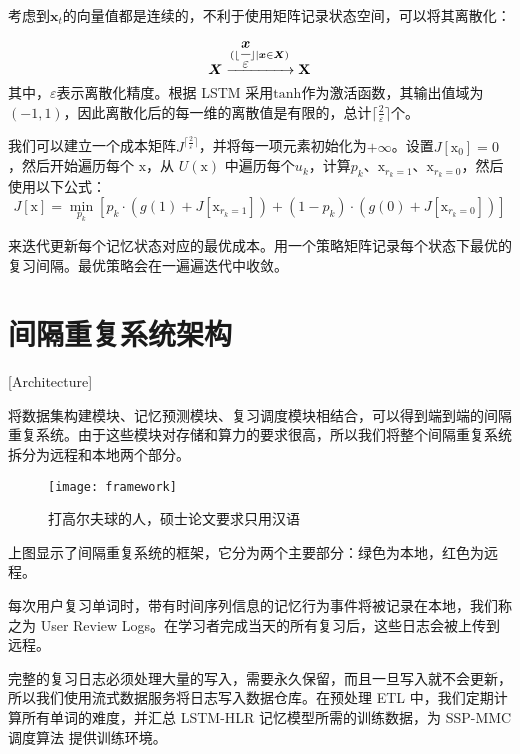考虑到$\boldsymbol x_t$的向量值都是连续的，不利于使用矩阵记录状态空间，可以将其离散化：
\begin{equation}
\boldsymbol X \xrightarrow[]{(\lfloor \cfrac{\boldsymbol x}{\varepsilon} \rfloor|\boldsymbol x \in \boldsymbol X)} \boldsymbol{\mathrm{X}}
\end{equation}
其中，$\varepsilon$表示离散化精度。根据 LSTM 采用$\mathrm{tanh}$作为激活函数，其输出值域为$(-1,1)$，因此离散化后的每一维的离散值是有限的，总计$\lceil\frac{2}{\varepsilon}\rceil$个。

我们可以建立一个成本矩阵$J^{\lceil\frac{2}{\varepsilon}\rceil}$，并将每一项元素初始化为$+\infty$。设置$J[\boldsymbol{\mathrm{x_0}}] = 0$，然后开始遍历每个 $\boldsymbol{\mathrm{x}}$，从 $U(\boldsymbol{\mathrm{x}})$ 中遍历每个$u_k$，计算$p_k$、$\boldsymbol{\mathrm{x}}_{r_k=1}$、$\boldsymbol{\mathrm{x}}_{r_k=0}$，然后使用以下公式：
\begin{equation}
J[\boldsymbol{\mathrm{x}}] = \min\limits_{p_k} [p_k \cdot (g(1) + J[\boldsymbol{\mathrm{x}}_{r_k=1}]) + (1-p_k) \cdot (g(0) + J[\boldsymbol{\mathrm{x}}_{r_k=0}])]
\end{equation}

来迭代更新每个记忆状态对应的最优成本。用一个策略矩阵记录每个状态下最优的复习间隔。最优策略会在一遍遍迭代中收敛。

\section{间隔重复系统架构}[Architecture]

将数据集构建模块、记忆预测模块、复习调度模块相结合，可以得到端到端的间隔重复系统。由于这些模块对存储和算力的要求很高，所以我们将整个间隔重复系统拆分为远程和本地两个部分。

\begin{figure}[htpb]
\centering
\texttt{[image: framework]}
\caption{打高尔夫球的人，硕士论文要求只用汉语}
\end{figure}

上图显示了间隔重复系统的框架，它分为两个主要部分：绿色为本地，红色为远程。

每次用户复习单词时，带有时间序列信息的记忆行为事件将被记录在本地，我们称之为 User Review Logs。在学习者完成当天的所有复习后，这些日志会被上传到远程。

完整的复习日志必须处理大量的写入，需要永久保留，而且一旦写入就不会更新，所以我们使用流式数据服务将日志写入数据仓库。在预处理 ETL 中，我们定期计算所有单词的难度，并汇总 LSTM-HLR 记忆模型所需的训练数据，为 SSP-MMC 调度算法 提供训练环境。

